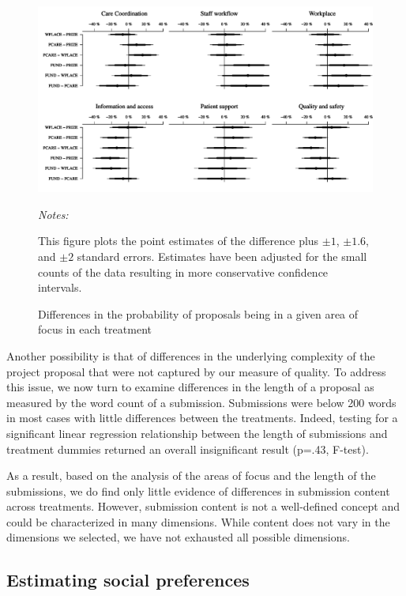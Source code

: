 \documentclass[12pt, titlepage]{article}
\newenvironment{tablenotes}[1][]{
  \begin{minipage}{\textwidth}\emph{Notes:}{\footnotesize #1}
}{\end{minipage}}
\begin{document}
\begin{figure}
  \centering
  \caption{Differences in the probability of proposals being in a given area of focus in each treatment}
  \label{fig: areas of focus}
  \includegraphics{figures/areas-1.pdf}
  \begin{tablenotes}
  This figure plots the point estimates of the difference plus $\pm 1$, $\pm 1.6$, and $\pm 2$ standard errors. Estimates have been adjusted for the small counts of the data \citep{agresti2000simple} resulting in more conservative confidence intervals.
  \end{tablenotes}
\end{figure}

Another possibility is that of differences in the underlying complexity
of the project proposal that were not captured by our measure of
quality. To address this issue, we now turn to examine differences in
the length of a proposal as measured by the word count of a submission.
Submissions were below 200 words in most cases with little differences
between the treatments. Indeed, testing for a significant linear
regression relationship between the length of submissions and treatment
dummies returned an overall insignificant result (p=.43, F-test).

As a result, based on the analysis of the areas of focus and the length
of the submissions, we do find only little evidence of differences in
submission content across treatments. However, submission content is not
a well-defined concept and could be characterized in many dimensions.
While content does not vary in the dimensions we selected, we have not
exhausted all possible dimensions.

\subsection{Estimating social
preferences}\label{estimating-social-preferences}
\end{document}
